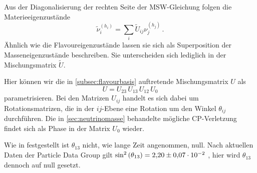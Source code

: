 Aus der Diagonalisierung der rechten Seite der MSW-Gleichung folgen die Materieeigenzustände
\begin{equation}
    \tilde{\nu}^{(h_i)}_i = \sum_i \tilde{U}_{i j} \nu^{(h_j)}_j \,.
    \label{eq:materiebasis}
\end{equation} 
Ähnlich wie die Flavoureigenzustände lassen sie sich als Superposition der Masseneigenzustände beschreiben.
Sie unterscheiden sich lediglich in der Mischungsmatrix $\tilde{U}$.

Hier können wir die in \autoref{subsec:flavourbasis} auftretende Mischungsmatrix $U$ als
\begin{equation}
    U = U_{2 3} \, U_{1 3} \, U_{1 2} \, U_0
    \label{eq:kopplungflavour}
\end{equation}
parametrisieren.
Bei den Matrizen $U_{i j}$ handelt es sich dabei um Rotationsmatrizen, die in der $i j$-Ebene eine Rotation um den Winkel $\theta_{i j}$ durchführen.
Die in \autoref{sec:neutrinomasse} behandelte mögliche CP-Verletzung findet sich als Phase in der Matrix $U_0$ wieder.

Wie in \cite{theta13} festgestellt ist $\theta_{1 3}$ nicht, wie lange Zeit angenommen, null.
Nach aktuellen Daten der Particle Data Group gilt $\sin^2 \left(\theta_{1 3} \right) = \num{2.20 +- 0.07} \cdot 10^{-2}$ \cite{neutrinospdg}, hier wird $\theta_{1 3}$ dennoch auf null gesetzt.

